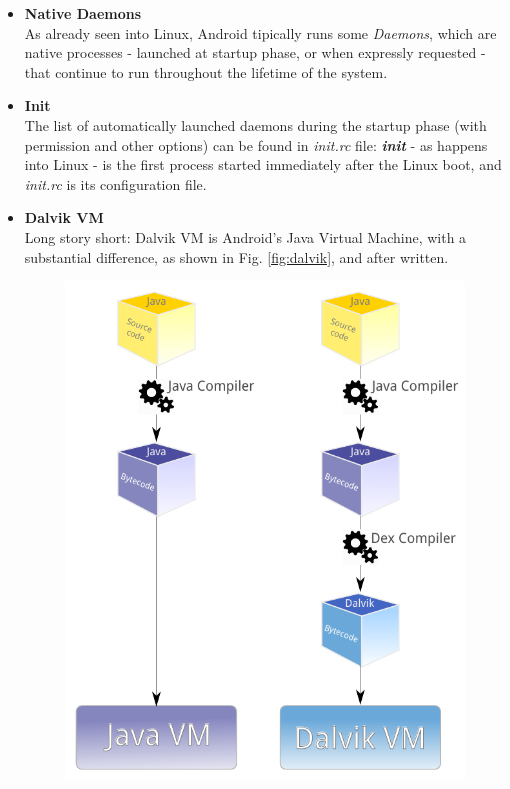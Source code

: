 \begin{itemize}
\item \textbf{Native Daemons}\\
As already seen into Linux, Android tipically runs some \textit{Daemons}, which are native processes - launched at startup phase, or when expressly requested - that continue to run throughout the lifetime of the system.
\item \textbf{Init}\\
The list of automatically launched daemons during the startup phase (with permission and other options) can be found in \textit{init.rc} file: \textit{\textbf{init}} - as happens into Linux - is the first process started immediately after the Linux boot, and \textit{init.rc} is its configuration file.
\item \textbf{Dalvik VM}\\
Long story short: Dalvik VM is Android's Java Virtual Machine, with a substantial difference, as shown in Fig. \ref{fig:dalvik}, and after written.\\
\begin{figure}[!htb]
	\centering
	\includegraphics[scale=.7]{images/dalvik.pdf}

\end{figure}
\end{itemize}
